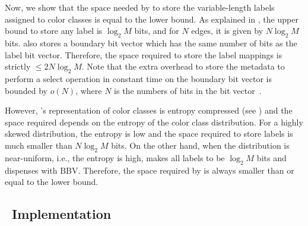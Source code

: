 Now, we show that the space needed by \rainbowfish to store the variable-length
labels assigned to color classes is equal to the lower bound. As explained in
, the upper bound to store any label is $\log_2{M}$ bits,
and for $N$ edges, it is given by $N\log_2{M}$ bits.  \rainbowfish also stores a
boundary bit vector which has the same number of bits as the label bit vector.
Therefore, the space required to store the label mappings is strictly $\leq
2N\log_2{M}$. Note that the extra overhead to store the metadata to perform a
select operation in constant time on the boundary bit vector is bounded by
$o(N)$, where $N$ is the numbers of bits in the bit
vector~\cite{GonzalezGrMa05}.

However, \rainbowfish's representation of color classes is entropy compressed (see
) and the space required depends on the entropy of the color class
distribution. For a highly skewed distribution, the entropy is low and the space
required to store labels is much smaller than $N\log_2{M}$ bits. On the other
hand, when the distribution is near-uniform, i.e., the entropy is high, \rainbowfish
makes all labels to be $\log_2{M}$ bits and dispenses with BBV. Therefore, the
space required by \rainbowfish is always smaller than or equal to the lower bound.



\subsection{~Implementation}

